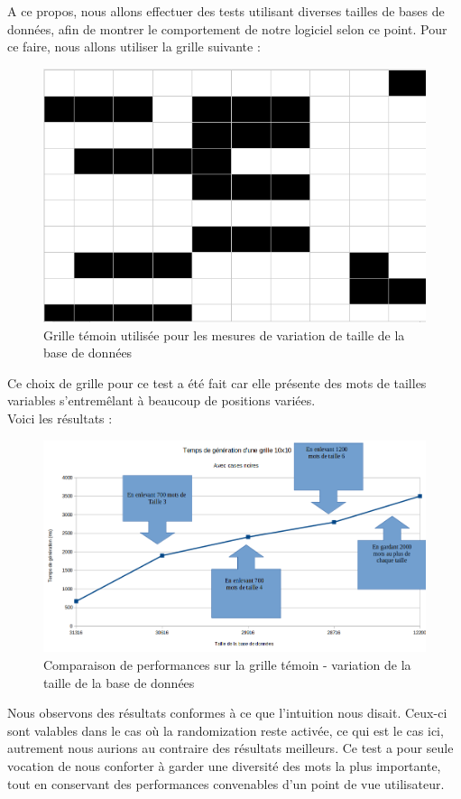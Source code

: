 \documentclass [ 11 pt ] {article}
\begin{document}
    A ce propos, nous allons effectuer des tests utilisant diverses tailles de bases de données, afin de montrer le comportement de notre logiciel selon ce point. Pour ce faire, nous allons utiliser la grille suivante : \\
    
    \begin{figure}[H] 
    \center 
    \includegraphics[width=0.7\linewidth]{bdd_pattern.png}
    \caption{Grille témoin utilisée pour les mesures de variation de taille de la base de données}
    \end{figure}
    
    Ce choix de grille pour ce test a été fait car elle présente des mots de tailles variables s'entremêlant à beaucoup de positions variées. \\
    \newpage
    Voici les résultats : \\
    
    \begin{figure}[H] 
    \center 
    \includegraphics[width=0.7\linewidth]{bdd.png}
    \caption{Comparaison de performances sur la grille témoin - variation de la taille de la base de données}
    \end{figure}
    
    Nous observons des résultats conformes à ce que l'intuition nous disait. Ceux-ci sont valables dans le cas où la randomization reste activée, ce qui est le cas ici, autrement nous aurions au contraire des résultats meilleurs. Ce test a pour seule vocation de nous conforter à garder une diversité des mots la plus importante, tout en conservant des performances convenables d'un point de vue utilisateur. \\
    
\end{document}
